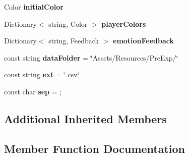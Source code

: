 \begin{DoxyCompactItemize}
\mbox{\label{class_platforms_generation_emotion_controller_abb06fd2357e1b5834d0d6fb5699b0bd9}} 
Color {\bfseries initial\+Color}
\item 
\mbox{\label{class_platforms_generation_emotion_controller_a57a6581056d733016a14eb7dc6db3bb0}} 
Dictionary$<$ string, Color $>$ {\bfseries player\+Colors}
\item 
\mbox{\label{class_platforms_generation_emotion_controller_af5e5582886fc396e2674c439e3ead579}} 
Dictionary$<$ string, Feedback $>$ {\bfseries emotion\+Feedback}
\item 
\mbox{\label{class_platforms_generation_emotion_controller_ac35904d78c7bad3906c9de215cc02623}} 
const string {\bfseries data\+Folder} = \char`\"{}Assets/Resources/Pre\+Exp/\char`\"{}
\item 
\mbox{\label{class_platforms_generation_emotion_controller_a5b02a9c3c4a94c52127ffaa764f22dc8}} 
const string {\bfseries ext} = \char`\"{}.csv\char`\"{}
\item 
\mbox{\label{class_platforms_generation_emotion_controller_aa041220acadfdb6c18e779947de3b1cc}} 
const char {\bfseries sep} = \textquotesingle{};\textquotesingle{}
\end{DoxyCompactItemize}
\subsection*{Additional Inherited Members}


\subsection{Member Function Documentation}
\mbox{\label{class_platforms_generation_emotion_controller_a557b90796bdcfd06701f93338b9180d9}} 
